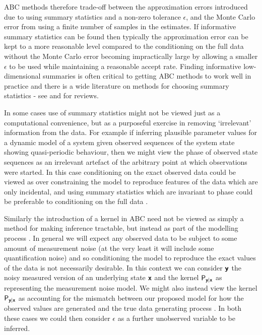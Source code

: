 \ac{ABC} methods therefore trade-off between the approximation errors introduced due to using summary statistics and a non-zero tolerance $\epsilon$, and the Monte Carlo error from using a finite number of samples in the estimates. If informative summary statistics can be found then typically the approximation error can be kept to a more reasonable level compared to the conditioning on the full data without the Monte Carlo error becoming impractically large by allowing a smaller $\epsilon$ to be used while maintaining a reasonable accept rate. Finding informative low-dimensional summaries is often critical to getting \ac{ABC} methods to work well in practice and there is a wide literature on methods for choosing summary statistics - see \citep{prangle2015summary} and \citep{blum2013comparative} for reviews. 

In some cases use of summary statistics might not be viewed just as a computational convenience, but as a purposeful exercise in removing `irrelevant' information from the data. For example if inferring plausible parameter values for a dynamic model of a system given observed sequences of the system state showing quasi-periodic behaviour, then we might view the phase of observed state sequences as an irrelevant artefact of the arbitrary point at which observations were started. In this case conditioning on the exact observed data could be viewed as over constraining the model to reproduce features of the data which are only incidental, and using summary statistics which are invariant to phase could be preferable to conditioning on the full data \citep{wood2010statistical}.

Similarly the introduction of a kernel in \ac{ABC} need not be viewed as simply a method for making inference tractable, but instead as part of the modelling process \citep{wilkinson2013approximate}. In general we will expect any observed data to be subject to some amount of measurement noise (at the very least it will include some quantification noise) and so conditioning the model to reproduce the exact values of the data is not necessarily desirable. In this context we can consider $\boldsymbol{\mathsf{y}}$ the noisy measured version of an underlying state $\boldsymbol{\mathsf{x}}$ and the kernel $\mathsf{P}_{\boldsymbol{\mathsf{y}}|\boldsymbol{\mathsf{x}}}$ as representing the measurement noise model. We might also instead view the kernel $\mathsf{P}_{\boldsymbol{\mathsf{y}}|\boldsymbol{\mathsf{x}}}$ as accounting for the mismatch between our proposed model for how the observed values are generated and the true data generating process \citep{ratmann2009model,wilkinson2013approximate}. In both these cases we could then consider $\epsilon$ as a further unobserved variable to be inferred.


